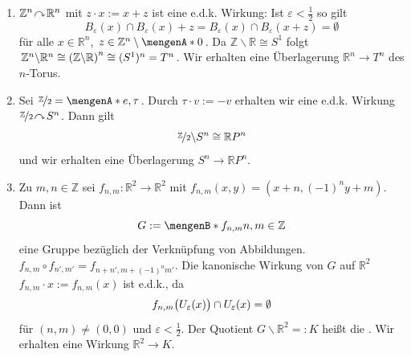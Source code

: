\begin{enumerate}[(1)]
	\item $\mathds{Z}^n \wirkung \mathds{R}^n$ mit $z \cdot x := x + z$ ist eine e.d.k. Wirkung: Ist $\varepsilon < \frac{1}{2}$ so gilt 
	\[
		B_\varepsilon(x) \cap B_\varepsilon(x) + z = B_\varepsilon(x) \cap B_\varepsilon(x +z) = \emptyset
	\]
	für alle $x \in \mathds{R}^n$, $z \in \mathds{Z}^n \setminus \set{0}$. Da $\mathds{Z} \backslash \mathds{R} \cong S^1$ folgt 
	$\mathds{Z}^n \backslash \mathds{R}^n \cong \enbrace*{\mathds{Z} \backslash \mathds{R}}^n \cong (S^1)^n = T^n $. Wir erhalten eine Überlagerung $\mathds{R}^n \to T^n$ 
	des $n$-Torus.
	\item Sei $\nicefrac{\mathds{Z}}{2} = \set{e, \tau}$. Durch $\tau \cdot v := - v$ erhalten wir eine e.d.k. Wirkung $\nicefrac{\mathds{Z}}{2} \wirkung S^n$. Dann gilt
	\[
		\nicefrac{\mathds{Z}}{2} \backslash S^n \cong \mathds{R}P^n
	\]
	und wir erhalten eine Überlagerung $S^n \to \mathds{R}P^n$. 
	\item Zu $m,n \in \mathds{Z}$ sei $f_{n,m} : \mathds{R}^2 \to \mathds{R}^2$ mit $f_{n,m} (x,y) = (x + n, (-1)^n y + m)$. Dann ist 
	\[
		G := \set[f_{n,m}]{n,m \in \mathds{Z}} 
	\]
	eine Gruppe bezüglich der Verknüpfung von Abbildungen. $f_{n,m} \circ f_{n',m'} = f_{n+n', m+ (-1)^n m'}$. Die kanonische Wirkung von $G$ auf $\mathds{R}^2$ 
	$f_{n,m} \cdot x := f_{n,m}(x)$ ist e.d.k., da 
	\[
		f_{n,m} \enbrace[\big]{U_\varepsilon(x)} \cap U_\varepsilon(x) = \emptyset  
	\]
	für $(n,m) \not= (0,0)$ und $\varepsilon < \frac{1}{2}$. Der Quotient $G\backslash \mathds{R}^2 =: K$ heißt die . Wir erhalten eine Wirkung
	$\mathds{R}^2 \to K$.  
	\begin{figure}[ht]
	\end{figure}
\end{enumerate}

